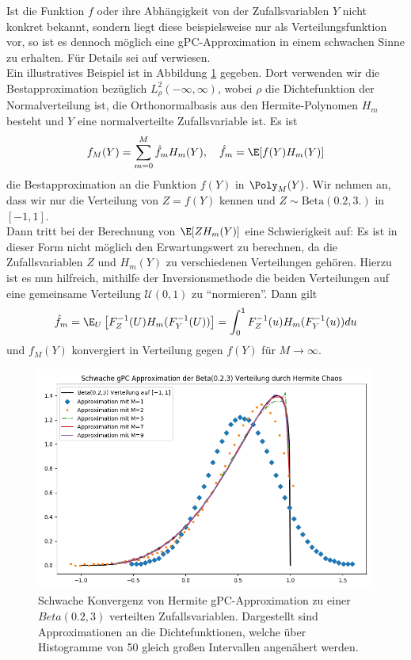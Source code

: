 \begin{mathbem}
Ist die Funktion $f$ oder ihre Abhängigkeit von der Zufallsvariablen $Y$ nicht konkret bekannt, sondern liegt diese beispielsweise nur als Verteilungsfunktion vor, so ist es dennoch möglich eine gPC-Approximation in einem schwachen Sinne zu erhalten. Für Details sei auf \autocite[Kapitel 5.1.2]{dongbinxiu2010} verwiesen.\\
Ein illustratives Beispiel ist in Abbildung \ref{fig:gpcweakconv} gegeben. Dort verwenden wir die Bestapproximation bezüglich $L_\rho^2(-\infty,\infty)$, wobei $\rho$ die Dichtefunktion der Normalverteilung ist, die Orthonormalbasis aus den Hermite-Polynomen $H_m$ besteht und $Y$ eine normalverteilte Zufallsvariable ist. Es ist
\[f_M(Y)=\sum_{m=0}^M\hat{f}_mH_m(Y), \quad \hat{f}_m=\E[f(Y)H_m(Y)]\]
die Bestapproximation an die Funktion $f(Y)$ in $\Poly_M(Y)$. Wir nehmen an, dass wir nur die Verteilung von $Z=f(Y)$ kennen und $Z\sim\text{Beta}(0.2,3.)$ in $[-1,1]$.\\
Dann tritt bei der Berechnung von $\E[ZH_m(Y)]$ eine Schwierigkeit auf: Es ist in dieser Form nicht möglich den Erwartungswert zu berechnen, da die Zufallsvariablen $Z$ und $H_m(Y)$ zu verschiedenen Verteilungen gehören. Hierzu ist es nun hilfreich, mithilfe der Inversionsmethode die beiden Verteilungen auf eine gemeinsame Verteilung $\mathcal{U}(0,1)$ zu "`normieren"'. Dann gilt
\[\hat{f}_m=\E_U\left[F_Z^{-1}(U)H_m(F_Y^{-1}(U))\right]=\int_0^1F_Z^{-1}(u)H_m(F_Y^{-1}(u))du\]
und $f_M(Y)$ konvergiert in Verteilung gegen $f(Y)$ für $M\to\infty$.
\begin{figure}[!htb]
\includegraphics[width=\textwidth]{Figures/gpc_weak_convergence.png}
\caption{Schwache Konvergenz von Hermite gPC-Approximation zu einer $Beta(0.2,3)$ verteilten Zufallsvariablen. Dargestellt sind Approximationen an die Dichtefunktionen, welche über Histogramme von 50 gleich großen Intervallen angenähert werden.}
\label{fig:gpcweakconv}
\end{figure}
\end{mathbem}

